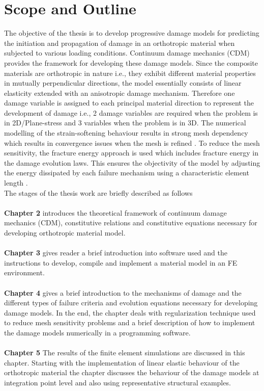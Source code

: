 \documentclass[12pt,openright,twoside]{report}
\begin{document}
\section{Scope and Outline}
\indent\indent\indent  The objective of the thesis is to develop progressive damage models for predicting the initiation and propagation of damage in an orthotropic material when subjected to various loading conditions. Continuum damage mechanics (CDM) provides the framework for developing these damage models. Since the composite materials are orthotropic in nature i.e., they exhibit different material properties in mutually perpendicular directions, the model essentially consists of linear elasticity extended with an anisotropic damage mechanism. Therefore one damage variable is assigned to each principal material direction to represent the development of damage i.e., 2 damage variables are required when the problem is in 2D/Plane-stress  and 3 variables when the problem is in 3D. The numerical modelling of the strain-softening behaviour results in strong mesh dependency which results in convergence issues when the mesh is refined \citep{wang2009three}. To reduce the mesh sensitivity, the fracture energy approach is used which includes fracture energy in the damage evolution laws. This ensures the objectivity of the model by adjusting the energy dissipated by each failure mechanism using a characteristic element length \citep{falzon2011numerical}.\\
The stages of the thesis work are briefly described as follows\\\\
\textbf{Chapter 2} introduces the theoretical framework of continuum damage mechanics (CDM), constitutive relations and constitutive equations necessary for developing orthotropic material model. \\\\
\textbf{Chapter 3} gives reader a brief introduction into software used and the instructions to develop, compile and implement a material model in an FE environment. \\\\
\textbf{Chapter 4} gives a brief introduction to the mechanisms of damage and the different types of failure criteria and evolution equations necessary for developing damage models. In the end, the chapter deals with regularization technique used to reduce mesh sensitivity problems and a brief description of how to implement the damage models numerically in a programming software. \\\\
\textbf{Chapter 5} The results of the finite element simulations are discussed in this chapter. Starting with the implementation of linear elastic behaviour of the orthotropic material the chapter discusses the behaviour of the damage models at integration point level and also using representative structural examples.  
\end{document}
